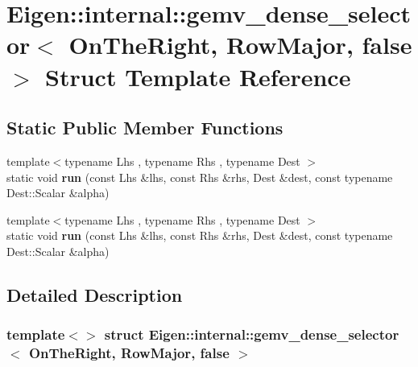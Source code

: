\hypertarget{struct_eigen_1_1internal_1_1gemv__dense__selector_3_01_on_the_right_00_01_row_major_00_01false_01_4}{}\section{Eigen\+:\+:internal\+:\+:gemv\+\_\+dense\+\_\+selector$<$ On\+The\+Right, Row\+Major, false $>$ Struct Template Reference}
\label{struct_eigen_1_1internal_1_1gemv__dense__selector_3_01_on_the_right_00_01_row_major_00_01false_01_4}
\subsection*{Static Public Member Functions}
\begin{DoxyCompactItemize}
\item 
\mbox{\label{struct_eigen_1_1internal_1_1gemv__dense__selector_3_01_on_the_right_00_01_row_major_00_01false_01_4_afa82dad5040f5ee77dc8715e78029573}} 
{\footnotesize template$<$typename Lhs , typename Rhs , typename Dest $>$ }\\static void {\bfseries run} (const Lhs \&lhs, const Rhs \&rhs, Dest \&dest, const typename Dest\+::\+Scalar \&alpha)
\item 
\mbox{\label{struct_eigen_1_1internal_1_1gemv__dense__selector_3_01_on_the_right_00_01_row_major_00_01false_01_4_afa82dad5040f5ee77dc8715e78029573}} 
{\footnotesize template$<$typename Lhs , typename Rhs , typename Dest $>$ }\\static void {\bfseries run} (const Lhs \&lhs, const Rhs \&rhs, Dest \&dest, const typename Dest\+::\+Scalar \&alpha)
\end{DoxyCompactItemize}


\subsection{Detailed Description}
\subsubsection*{template$<$$>$\newline
struct Eigen\+::internal\+::gemv\+\_\+dense\+\_\+selector$<$ On\+The\+Right, Row\+Major, false $>$}



